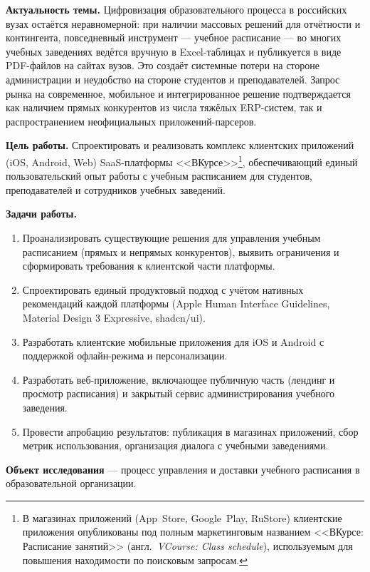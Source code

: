 

\textbf{Актуальность темы.} Цифровизация образовательного процесса в российских вузах остаётся неравномерной: при наличии массовых решений для отчётности и контингента, повседневный инструмент --- учебное расписание --- во многих учебных заведениях ведётся вручную в Excel-таблицах и публикуется в виде PDF-файлов на сайтах вузов. Это создаёт системные потери на стороне администрации и неудобство на стороне студентов и преподавателей. Запрос рынка на современное, мобильное и интегрированное решение подтверждается как наличием прямых конкурентов из числа тяжёлых ERP-систем, так и распространением неофициальных приложений-парсеров.

\textbf{Цель работы.} Спроектировать и реализовать комплекс клиентских приложений (iOS, Android, Web) SaaS-платформы <<ВКурсе>>\footnote{В магазинах приложений (App~Store, Google~Play, RuStore) клиентские приложения опубликованы под полным маркетинговым названием <<ВКурсе: Расписание занятий>> (англ.~\emph{VCourse: Class schedule}), используемым для повышения находимости по поисковым запросам.}, обеспечивающий единый пользовательский опыт работы с учебным расписанием для студентов, преподавателей и сотрудников учебных заведений.

\textbf{Задачи работы.}
\begin{enumerate}
  \item Проанализировать существующие решения для управления учебным расписанием (прямых и непрямых конкурентов), выявить ограничения и сформировать требования к клиентской части платформы.
  \item Спроектировать единый продуктовый подход с учётом нативных рекомендаций каждой платформы (Apple Human Interface Guidelines, Material Design 3 Expressive, shadcn/ui).
  \item Разработать клиентские мобильные приложения для iOS и Android с поддержкой офлайн-режима и персонализации.
  \item Разработать веб-приложение, включающее публичную часть (лендинг и просмотр расписания) и закрытый сервис администрирования учебного заведения.
  \item Провести апробацию результатов: публикация в магазинах приложений, сбор метрик использования, организация диалога с учебными заведениями.
\end{enumerate}

\textbf{Объект исследования} --- процесс управления и доставки учебного расписания в образовательной организации.

